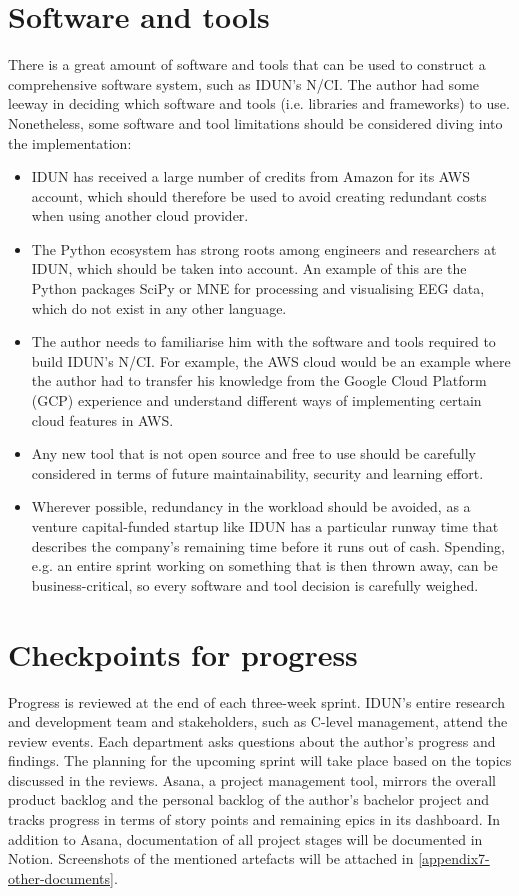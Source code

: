 \section{Software and tools}
\label{chapter3-software-and-tools}

There is a great amount of software and tools that can be used to construct a comprehensive software system, such as IDUN's N/CI. The author had some leeway in deciding which software and tools (i.e. libraries and frameworks) to use. Nonetheless, some software and tool limitations should be considered diving into the implementation:

\begin{itemize}
  \item IDUN has received a large number of credits from Amazon for its AWS account, which should therefore be used to avoid creating redundant costs when using another cloud provider.
  \item The Python ecosystem has strong roots among engineers and researchers at IDUN, which should be taken into account. An example of this are the Python packages SciPy or MNE for processing and visualising EEG data, which do not exist in any other language.
  \item The author needs to familiarise him with the software and tools required to build IDUN's N/CI. For example, the AWS cloud would be an example where the author had to transfer his knowledge from the Google Cloud Platform (GCP) experience and understand different ways of implementing certain cloud features in AWS.
  \item Any new tool that is not open source and free to use should be carefully considered in terms of future maintainability, security and learning effort.
  \item Wherever possible, redundancy in the workload should be avoided, as a venture capital-funded startup like IDUN has a particular runway time that describes the company's remaining time before it runs out of cash. Spending, e.g. an entire sprint working on something that is then thrown away, can be business-critical, so every software and tool decision is carefully weighed.
\end{itemize}

\section{Checkpoints for progress}
\label{chapter3-checkpoints-for-progress}

Progress is reviewed at the end of each three-week sprint. IDUN's entire research and development team and stakeholders, such as C-level management, attend the review events. Each department asks questions about the author's progress and findings. The planning for the upcoming sprint will take place based on the topics discussed in the reviews. Asana, a project management tool, mirrors the overall product backlog and the personal backlog of the author's bachelor project and tracks progress in terms of story points and remaining epics in its dashboard. In addition to Asana, documentation of all project stages will be documented in Notion. Screenshots of the mentioned artefacts will be attached in \autoref{appendix7-other-documents}.


